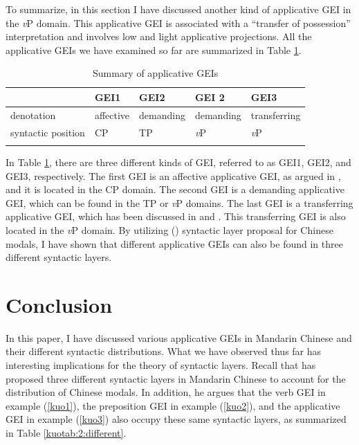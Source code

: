 \documentclass[output=paper,colorlinks,citecolor=brown]{langscibook}
\begin{document}
To summarize, in this section I have discussed another kind of applicative GEI in the \textit{v}P domain. This applicative GEI is associated with a ``transfer of possession'' interpretation and involves low and light applicative projections. All the applicative GEIs we have examined so far are summarized in Table \ref{kuotab:1:three}.

\begin{table}
\caption{Summary of applicative GEIs}
\label{kuotab:1:three}
 \begin{tabular}{lllll} 
  \lsptoprule
            & GEI1 & GEI2 & GEI 2 & GEI3\\ 
  \midrule
  denotation  &  affective &  demanding &  demanding  & transferring\\
  syntactic position  & CP & TP & \textit{v}P & \textit{v}P\\
  \lspbottomrule
 \end{tabular}
\end{table}

In Table \ref{kuotab:1:three}, there are three different kinds of GEI, referred to as GEI1, GEI2, and GEI3, respectively. The first GEI is an affective applicative GEI, as argued in \citet{Tsai2017}, and it is located in the CP domain. The second GEI is a demanding applicative GEI, which can be found in the TP or \textit{v}P domains. The last GEI is a transferring applicative GEI, which has been discussed in \citet{Paul&Whitman2010} and \citet{Kuo2016}. This transferring GEI is also located in the \textit{v}P domain. By utilizing  (\citeyear{Tsai2015a}) syntactic layer proposal for Chinese modals, I have shown that different applicative GEIs can also be found in three different syntactic layers.

\section{Conclusion}\label{sect6}

In this paper, I have discussed various applicative GEIs in Mandarin Chinese and their different syntactic distributions. What we have observed thus far has interesting implications for the theory of syntactic layers. Recall that \citet{Tsai2017} has proposed three different syntactic layers in Mandarin Chinese to account for the distribution of Chinese modals. In addition, he argues that the verb GEI in example (\ref{kuo1}), the preposition GEI in example (\ref{kuo2}), and the applicative GEI in example (\ref{kuo3}) also occupy these same syntactic layers, as summarized in Table \ref{kuotab:2:different}.
\end{document}
